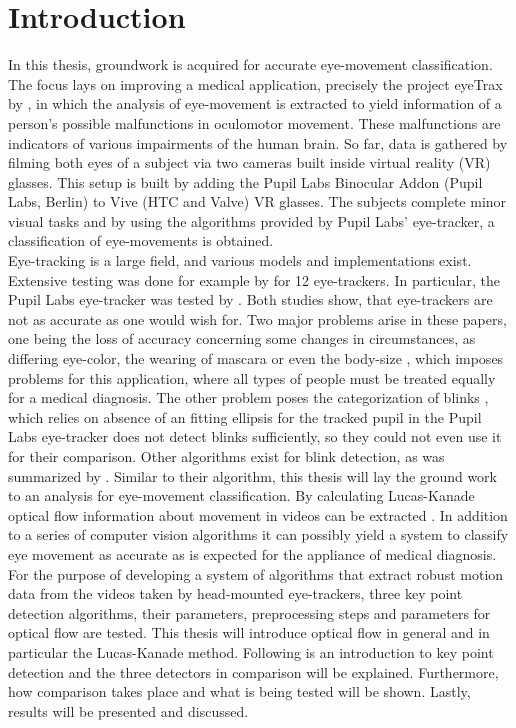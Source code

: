 \documentclass[Bachelorarbeit.tex]{subfiles}
\begin{document}
\newpage
\section{Introduction}
\label{Introduction}
In this thesis, groundwork is acquired for accurate eye-movement classification. The focus lays on improving a medical application, precisely the project eyeTrax by \cite{eyeTrax}, in which the analysis of eye-movement is extracted to yield information of a person's possible malfunctions in oculomotor movement. These malfunctions are indicators of various impairments of the human brain. So far, data is gathered by filming both eyes of a subject via two cameras built inside virtual reality (VR) glasses. This setup is built by adding the Pupil Labs Binocular Addon (Pupil Labs, Berlin) to Vive (HTC and Valve) VR glasses. The subjects complete minor visual tasks and by using the algorithms provided by Pupil Labs' eye-tracker, a classification of eye-movements is obtained.
\\ Eye-tracking is a large field, and various models and implementations exist. Extensive testing was done for example by \cite{holmqvist2017common} for 12 eye-trackers. In particular, the Pupil Labs eye-tracker was tested by \cite{ehinger2019new}. Both studies show, that eye-trackers are not as accurate as one would wish for. Two major problems arise in these papers, one being the loss of accuracy concerning some changes in circumstances, as differing eye-color, the wearing of mascara or even the body-size \citep[pp. 19]{holmqvist2017common}, which imposes problems for this application, where all types of people must be treated equally for a medical diagnosis. The other problem poses the categorization of blinks \citep[p. 6]{ehinger2019new}, which relies on absence of an fitting ellipsis for the tracked pupil in the Pupil Labs eye-tracker does not detect blinks sufficiently, so they could not even use it for their comparison. Other algorithms exist for blink detection, as was summarized by \cite[pp. 2-4]{fogelton2016eye}. Similar to their algorithm, this thesis will lay the ground work to an analysis for eye-movement classification. By calculating Lucas-Kanade optical flow information about movement in videos can be extracted \citep{lucas1981iterative}. In addition to a series of computer vision algorithms it can possibly yield a system to classify eye movement as accurate as is expected for the appliance of medical diagnosis. 
\\ For the purpose of developing a system of algorithms that extract robust motion data from the videos taken by head-mounted eye-trackers, three key point detection algorithms, their parameters, preprocessing steps and parameters for optical flow are tested. This thesis will introduce optical flow in general and in particular the Lucas-Kanade method. Following is an introduction to key point detection and the three detectors in comparison will be explained. Furthermore, how comparison takes place and what is being tested will be shown. Lastly, results will be presented and discussed.


\FloatBarrier
\end{document}
